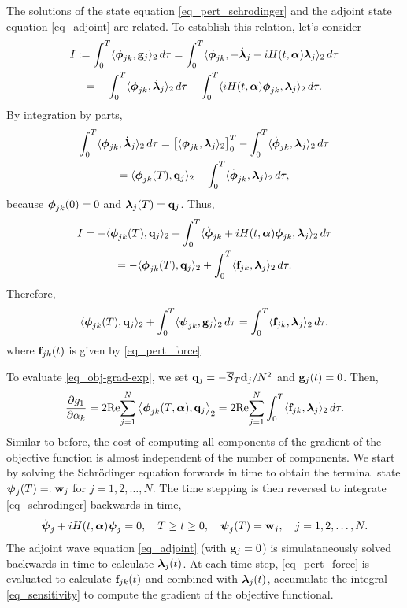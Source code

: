 \documentclass[11pt]{article}
\begin{document}
The solutions of the state equation \eqref{eq_pert_schrodinger} and the adjoint state equation
\eqref{eq_adjoint} are related. To establish this relation, let's consider
\begin{multline}
  I:= \int_0^T \langle \boldsymbol{\phi}_{jk}, {\mathbf g}_j \rangle_2\, d\tau =  \int_0^T \langle \boldsymbol{\phi}_{jk},
  -\dot{\boldsymbol{\lambda}}_j - iH(t,\boldsymbol{\alpha})\boldsymbol{\lambda}_j \rangle_2\, d\tau \\
  =  -\int_0^T \langle  \boldsymbol{\phi}_{jk},
  \dot{\boldsymbol{\lambda}}_{j} \rangle_2\, d\tau +  \int_0^T \langle iH(t,\boldsymbol{\alpha}) \boldsymbol{\phi}_{jk},\boldsymbol{\lambda}_j \rangle_2\, d\tau.
\end{multline}
By integration by parts,
\begin{multline*}
\int_0^T \langle  \phib_{jk}, \dot{\lambdab}_{j} \rangle_2\, d\tau =
%
\left[ \langle \phib_{jk}, \lambdab_j \rangle_2 \right]_0^T - \int_0^T \langle  \dot{\phib}_{jk},
\lambdab_{j} \rangle_2\, d\tau\\
%
= \langle \phib_{jk}(T), \qb_j \rangle_2  - \int_0^T \langle  \dot{\phib}_{jk}, \lambdab_{j} \rangle_2\, d\tau,
\end{multline*}
because $\boldsymbol{\phi}_{jk}(0)=0$ and $\boldsymbol{\lambda}_j(T) = {\mathbf q}_j$. Thus,
\begin{multline*}
I = -\langle \phib_{jk}(T), \qb_j \rangle_2 + \int_0^T \langle \dot{\phib}_{jk} + iH(t,\alphab)
\phib_{jk},\lambdab_j \rangle_2\, d\tau\\
%
= -\langle \phib_{jk}(T), \qb_j \rangle_2 + \int_0^T \langle \fb_{jk},\lambdab_j \rangle_2\, d\tau.
\end{multline*}
Therefore,
\begin{equation}\label{eq_adjoint-rel}
 \langle \boldsymbol{\phi}_{jk}(T), {\mathbf q}_j \rangle_2 + \int_0^T \langle \boldsymbol{\psi}_{jk},{\mathbf g}_j\rangle_2\, d\tau = \int_0^T \langle {\mathbf f}_{jk},\boldsymbol{\lambda}_j \rangle_2\, d\tau.
\end{equation}
where ${\mathbf f}_{jk}(t)$ is given by \eqref{eq_pert_force}.

To evaluate \eqref{eq_obj-grad-exp}, we set ${\mathbf q}_j = -\overline{S}_T {\mathbf d}_j/N^2$ and ${\mathbf g}_j(t)=0$. Then,
\begin{equation}\label{eq_sensitivity}
  \frac{\partial g_1}{\partial \alpha_k} =  2 {\rm Re}\! \sum_{j=1}^N \left\langle \boldsymbol{\phi}_{jk}(T,\boldsymbol{\alpha}),
  {\mathbf q}_j\right\rangle_2 =
  2 {\rm Re}\! \sum_{j=1}^N \int_0^T \langle {\mathbf f}_{jk},\boldsymbol{\lambda}_j \rangle_2\, d\tau.
\end{equation}
Similar to before, the cost of computing all components of the gradient of the objective function is
almost independent of the number of components. We start by solving the Schr\"odinger equation
forwards in time to obtain the terminal state $\boldsymbol{\psi}_j(T)=:{\mathbf w}_j$ for $j=1,2,\ldots,N$. The time
stepping is then reversed to integrate \eqref{eq_schrodinger} backwards in time,
\begin{equation}
\dot{\boldsymbol{\psi}}_j + iH(t,\boldsymbol{\alpha})\boldsymbol{\psi}_j=0,\quad T\geq t\geq 0, \quad \boldsymbol{\psi}_j(T)={\mathbf w}_j,\quad j=1,2,\ldots,N.
\end{equation}
The adjoint wave equation \eqref{eq_adjoint}  (with ${\mathbf g}_j=0$) is simulataneously solved backwards in time to
calculate $\boldsymbol{\lambda}_j(t)$. At each time step, \eqref{eq_pert_force} is evaluated to calculate ${\mathbf f}_{jk}(t)$ and combined with
$\boldsymbol{\lambda}_j(t)$, accumulate the integral \eqref{eq_sensitivity} to compute the gradient of the
objective functional.
\end{document}
